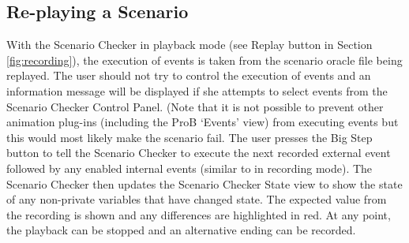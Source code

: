 \subsection{Re-playing a Scenario}
\label{sec:playback}

With the Scenario Checker in playback mode (see Replay button in Section \ref{fig:recording}), the execution of events is taken from the scenario oracle file being replayed.
The user should not try to control the execution of events and an information message will be displayed if she attempts to select events from the Scenario Checker Control Panel. 
(Note that it is not possible to prevent other animation plug-ins (including the ProB `Events' view) from executing events but this would most likely make the scenario fail. 
The user presses the Big Step button to tell the Scenario Checker to execute the next recorded external event followed by any enabled internal events (similar to in recording mode).
The Scenario Checker then updates the Scenario Checker State view to show the state of any non-private variables that have changed state.
The expected value from the recording is shown and any differences are highlighted in red.
At any point, the playback can be stopped and an alternative ending can be recorded.

